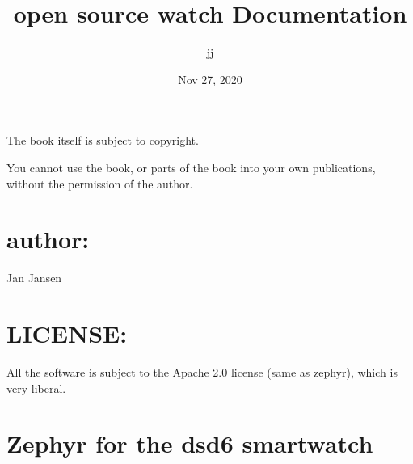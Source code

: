 \documentclass[letterpaper,10pt,english]{sphinxmanual}
\title{open source watch Documentation}
\date{Nov 27, 2020}
\author{jj}
\begin{document}
\pagestyle{empty}
\sphinxmaketitle
\pagestyle{plain}
\sphinxtableofcontents
\pagestyle{normal}
\label{\detokenize{index::doc}}
\noindent{}




The book itself is subject to copyright.

You cannot use the book, or parts of the book into your own publications, without the permission of the author.


\chapter{author:}
\label{\detokenize{copyright:author}}
Jan Jansen


\chapter{LICENSE:}
\label{\detokenize{copyright:license}}
All the software is subject to the Apache 2.0 license (same as zephyr), which is very liberal.


\chapter{Zephyr for the ds\sphinxhyphen{}d6    smartwatch}
\label{\detokenize{content:zephyr-for-the-ds-d6-smartwatch}}\label{\detokenize{content::doc}}
\begin{sphinxVerbatim}[commandchars=\\\{\}]
           


            
\end{sphinxVerbatim}
\end{document}
